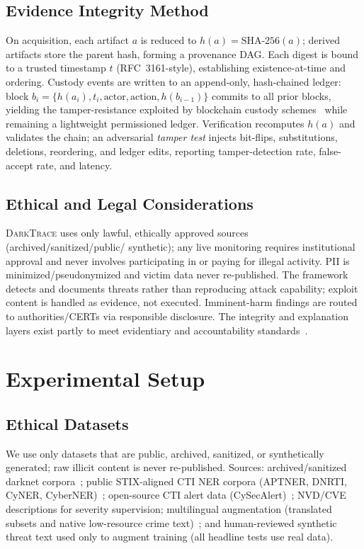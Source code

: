 \documentclass[11pt,a4paper]{article}
\newcommand{\framework}{\textsc{DarkTrace}}
\begin{document}
\subsection{Evidence Integrity Method}\label{sec:integrity}
On acquisition, each artifact $a$ is reduced to $h(a)=\text{SHA-256}(a)$; derived
artifacts store the parent hash, forming a provenance DAG. Each digest is bound to a
trusted timestamp $t$ (RFC~3161-style), establishing existence-at-time and ordering.
Custody events are written to an append-only, hash-chained ledger: block
$b_i=\{h(a_i),t_i,\text{actor},\text{action},h(b_{i-1})\}$ commits to all prior blocks,
yielding the tamper-resistance exploited by blockchain custody
schemes~\cite{lone2019forensicchain,ali2022procedure,loffi2025management} while remaining
a lightweight permissioned ledger. Verification recomputes $h(a)$ and validates the chain;
an adversarial \emph{tamper test} injects bit-flips, substitutions, deletions, reordering,
and ledger edits, reporting tamper-detection rate, false-accept rate, and latency.

\subsection{Ethical and Legal Considerations}\label{sec:ethics}
\framework{} uses only lawful, ethically approved sources (archived/sanitized/public/
synthetic); any live monitoring requires institutional approval and never involves
participating in or paying for illegal activity. PII is minimized/pseudonymized and victim
data never re-published. The framework detects and documents threats rather than
reproducing attack capability; exploit content is handled as evidence, not executed.
Imminent-harm findings are routed to authorities/CERTs via responsible disclosure. The
integrity and explanation layers exist partly to meet evidentiary and accountability
standards~\cite{nist80086,lone2019forensicchain}.

\section{Experimental Setup}\label{sec:setup}

\subsection{Ethical Datasets}
We use only datasets that are public, archived, sanitized, or synthetically generated;
raw illicit content is never re-published. Sources: archived/sanitized darknet
corpora~\cite{sangher2023towards}; public STIX-aligned CTI NER corpora (APTNER, DNRTI,
CyNER, CyberNER)~\cite{wang2022aptner,evangelatos2021ner,echchammakhy2025cyberner,feng2025promptbart};
open-source CTI alert data (CySecAlert)~\cite{riebe2021cysecalert}; NVD/CVE descriptions for
severity supervision; multilingual augmentation (translated subsets and native
low-resource crime text)~\cite{alharbi2025bert,nazir2025multilingual}; and human-reviewed
synthetic threat text used only to augment training (all headline tests use real data).
\end{document}
